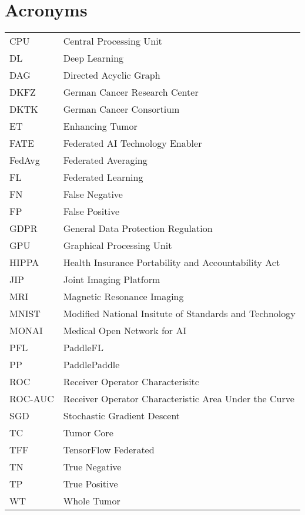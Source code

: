 \section*{Acronyms}
\begin{table}[H]
    \begin{tabular}{p{4cm} p{10cm}}
     CPU    & Central Processing Unit \\
     DL     & Deep Learning \\
     DAG    & Directed Acyclic Graph \\
     DKFZ   & German Cancer Research Center \\
     DKTK   & German Cancer Consortium \\
     ET     & Enhancing Tumor \\
     FATE   & Federated AI Technology Enabler \\
     FedAvg & Federated Averaging \\
     FL     & Federated Learning \\
     FN     & False Negative \\
     FP     & False Positive \\
     GDPR   & General Data Protection Regulation \\
     GPU    & Graphical Processing Unit \\
     HIPPA  & Health Insurance Portability and Accountability Act \\
     JIP    & Joint Imaging Platform \\
     MRI    & Magnetic Resonance Imaging \\
     MNIST  & Modified National Insitute of Standards and Technology \\
     MONAI  & Medical Open Network for AI \\
     PFL    & PaddleFL \\
     PP     & PaddlePaddle \\
     ROC    & Receiver Operator Characterisitc \\
     ROC-AUC & Receiver Operator Characteristic Area Under the Curve \\
     SGD    & Stochastic Gradient Descent \\
     TC     & Tumor Core \\
     TFF    & TensorFlow Federated \\
     TN     & True Negative \\
     TP     & True Positive \\
     WT     & Whole Tumor
    \end{tabular}%
\end{table}%
